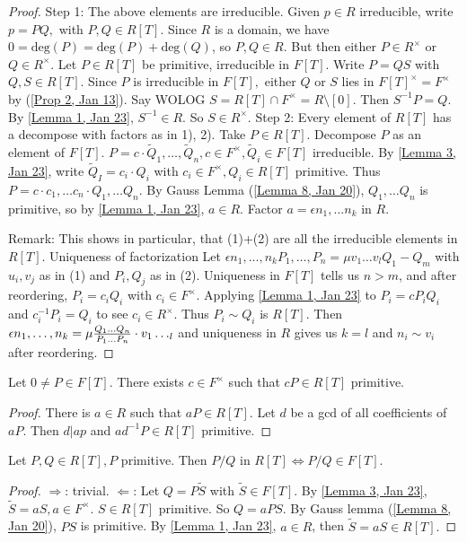 \begin{proof}
    Step 1: The above elements are irreducible.
    Given $p\in R$ irreducible, write $p=PQ,$ with $P,Q\in R[T]$. Since $R$ is a domain, we have $0=\text{deg}(P)=\text{deg}(P)+\text{deg}(Q)$, so $P,Q\in R$. But then either $P\in R^{\times}$ or $Q\in R^{\times}.$
    Let $P\in R[T]$ be primitive, irreducible in $F[T]$. Write $P=QS$ with $Q,S\in R[T].$ Since $P$ is irreducible in $F[T],$ either $Q$ or $S$ lies in $F[T]^{\times}=F^{\times}$ by (\ref{Prop 2, Jan 13}). Say WOLOG $S=R[T]\cap F^{\times}=R\setminus[0].$ Then $S^{-1}P=Q$. By \ref{Lemma 1, Jan 23}, $S^{-1}\in R.$ So $S\in R^{\times}.$
    Step 2: Every element of $R[T]$ has a decompose with factors as in 1), 2).
    Take $P\in R[T].$ Decompose $P$ as an element of $F[T]$. $P=c\cdot \tilde{Q}_1,\ldots,\tilde{Q}_n, c\in F^{\times}, \tilde{Q}_i\in F[T]$ irreducible. By \ref{Lemma 3, Jan 23}, write $\tilde{Q}_I=c_i\cdot Q_i$ with $c_i\in F^{\times}, Q_i\in R[T]$ primitive. Thus $P=c\cdot c_1,\ldots c_n\cdot Q_1,\ldots Q_n$. By Gauss Lemma (\ref{Lemma 8, Jan 20}), $Q_1,\ldots Q_n$ is primitive, so by \ref{Lemma 1, Jan 23}, $a\in R$. Factor $a=\epsilon n_1,\ldots n_k$ in $R$.

    Remark: This shows in particular, that (1)+(2) are all the irreducible elements in $R[T]$.
    Uniqueness of factorization
    Let $\epsilon n_1,\ldots, n_k P_1,\ldots, P_n= \mu v_1\ldots v_l Q_1-Q_m$ with $u_i,v_j$ as in (1) and $P_i,Q_j$ as in (2). Uniqueness in $F[T]$ tells us $n>m$, and after reordering, $P_i=c_iQ_i$ with $c_i\in F^{\times}$. Applying \ref{Lemma 1, Jan 23} to $P_i=cP_iQ_i$ and $c_i^{-1}P_i=Q_i$ to see $c_i\in R^{\times}$. Thus $P_i\sim Q_i$ is $R[T]$. Then $\epsilon n_1,\ldots, n_k=\mu {Q_1\ldots Q_n\over P_1\ldots P_n}\cdot v_1\ldots _l$ and uniqueness in $R$ gives us $k=l$ and $n_i\sim v_i$ after reordering.
\end{proof}

\begin{lemma}\label{Lemma 3, Jan 23}
    Let $0\ne P\in F[T].$ There exists $c\in F^{\times}$ such that $cP\in R[T]$ primitive.
\end{lemma}
\begin{proof}
There is $a\in R$ such that $aP\in R[T].$ Let $d$ be a gcd of all coefficients of $aP$. Then $d|ap$ and $ad^{-1}P\in R[T]$ primitive.
\end{proof}
\begin{lemma} \label{Lemma 4, Jan 23}
Let $P,Q\in R[T],P$ primitive. Then $P/Q$ in $R[T]\iff P/Q\in F[T]$.
\end{lemma}
\begin{proof}
$\Longrightarrow$: trivial.
$\Longleftarrow$: Let $Q=P\tilde{S}$ with $\tilde{S}\in F[T]$. By \ref{Lemma 3, Jan 23}, $\tilde{S}=aS,a\in F^{\times}$. $S\in R[T]$ primitive. So $Q=aPS$. By Gauss lemma (\ref{Lemma 8, Jan 20}), $PS$ is primitive. By \ref{Lemma 1, Jan 23}, $a\in R$, then $\tilde{S}=aS\in R[T].$
\end{proof}
